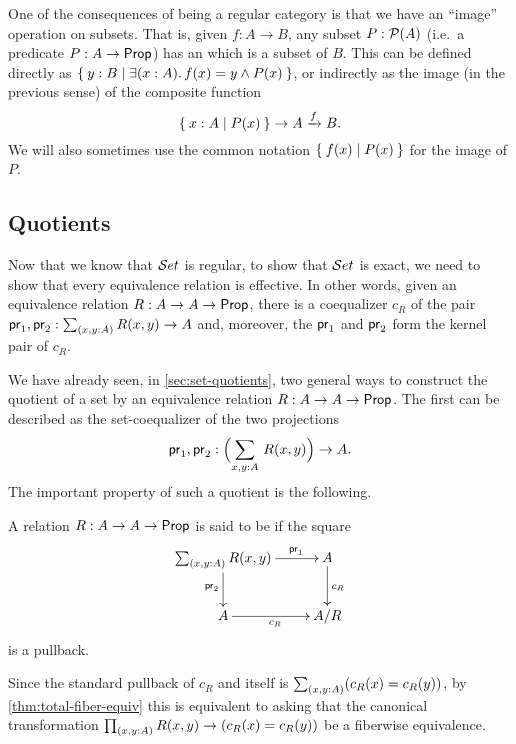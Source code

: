 One of the consequences of \uset being a regular category is that we have an ``image'' operation on subsets.
That is, given $f:A\to B$, any subset $P:\mathcal{P}(A)$ (i.e.\ a predicate $P:A\to \mathsf{Prop}$) has an  which is a subset of $B$.
This can be defined directly as $\setof{ y:B | \exis{x:A} f(x)=y \land P(x)}$, or indirectly as the image (in the previous sense) of the composite function
\[ \Set{ x:A | P(x) } \to A \xrightarrow{f} B.\]
We will also sometimes use the common notation $\Set{f(x) | P(x)}$ for the image of $P$.


\subsection{Quotients}\label{subsec:quotients}

%
Now that we know that $\mathcal{S}et$ is regular, to show that $\mathcal{S}et$ is exact, we need to show that every
equivalence relation is effective.
%
%
In other words, given an equivalence
relation $R:A\to A\to\mathsf{Prop}$, there is a coequalizer $c_R$ of the pair
$\proj1,\proj2:\sm{x,y:A} R(x,y)\to A$ and, moreover, the $\mathsf{pr}_{1}$ and $\mathsf{pr}_{2}$
form the kernel pair of $c_R$.

We have already seen, in \autoref{sec:set-quotients}, two general ways to construct the quotient of a set by an equivalence relation $R:A\to A\to\mathsf{Prop}$.
The first can be described as the set-coequalizer of the two projections
\[\proj1,\proj2:\Parens{\sm{x,y:A} R(x,y)} \to A.\]
The important property of such a quotient is the following.

\begin{defn}
  A relation $R:A\to A\to\mathsf{Prop}$ is said to be 
  if the square
\begin{equation*}
  \xymatrix{
    {\sm{x,y:A} R (x,y)}
    \ar[r]^(0.7){\proj1}
    \ar[d]_{\proj2}
    &
    {A}
    \ar[d]^{c_R}
    \\
    {A}
    \ar[r]_{c_R}
    &
    {A/R}
    }
\end{equation*}
is a pullback. 
\end{defn}

Since the standard pullback of $c_R$ and itself is $\sm{x,y:A} (c_R(x)=c_R(y))$, by \autoref{thm:total-fiber-equiv} this is equivalent to asking that the canonical transformation $\prd{x,y:A} R(x,y) \to (c_R(x)=c_R(y))$ be a fiberwise equivalence.


